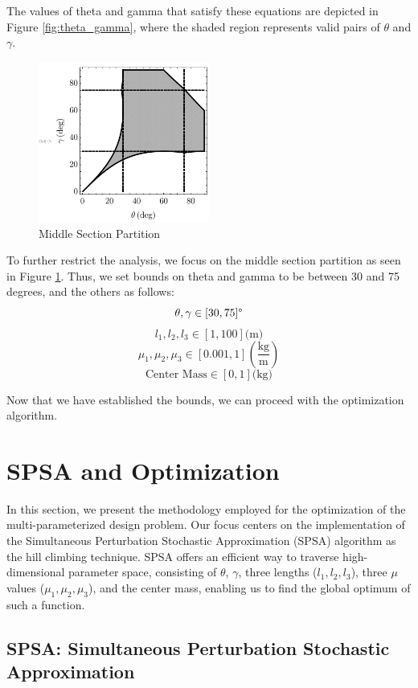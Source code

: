 \documentclass[12pt]{article}
\begin{document}
The values of theta and gamma that satisfy these equations are depicted in Figure \ref{fig:theta_gamma}, where the shaded region represents valid pairs of $\theta$ and $\gamma$.

\begin{figure}[H]
\centering
\includegraphics[width=0.5\textwidth]{anglediagram2.pdf}
\caption{Middle Section Partition}
\label{fig:middle_section_partition}
\end{figure}

To further restrict the analysis, we focus on the middle section partition as seen in Figure \ref{fig:middle_section_partition}. Thus, we set bounds on theta and gamma to be between 30 and 75 degrees, and the others as follows:
\[\theta, \gamma \in [30, 75] \text{\textdegree}\]
\[l_1, l_2, l_3 \in [1, 100] \text{(m)}\]
\[\mu_1, \mu_2, \mu_3 \in [0.001, 1] (\frac{\text{kg}}{\text{m}})\]
\[\text{Center Mass} \in [0, 1] \text{(kg)}\]

Now that we have established the bounds, we can proceed with the optimization algorithm.

\section{SPSA and Optimization}

In this section, we present the methodology employed for the optimization of the multi-parameterized design problem. Our focus centers on the implementation of the Simultaneous Perturbation Stochastic Approximation (SPSA) algorithm as the hill climbing technique. SPSA offers an efficient way to traverse high-dimensional parameter space, consisting of $\theta$, $\gamma$, three lengths ($l_1, l_2, l_3$), three $\mu$ values ($\mu_1, \mu_2, \mu_3$), and the center mass, enabling us to find the global optimum of such a function.

\subsection{SPSA: Simultaneous Perturbation Stochastic Approximation}
\end{document}
